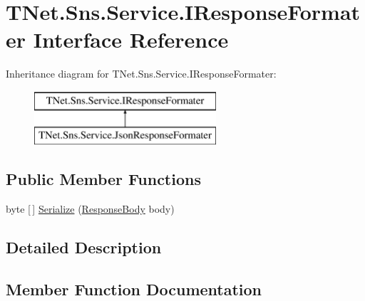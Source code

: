 \hypertarget{interface_t_net_1_1_sns_1_1_service_1_1_i_response_formater}{}\section{T\+Net.\+Sns.\+Service.\+I\+Response\+Formater Interface Reference}
\label{interface_t_net_1_1_sns_1_1_service_1_1_i_response_formater}


 


Inheritance diagram for T\+Net.\+Sns.\+Service.\+I\+Response\+Formater\+:\begin{figure}[H]
\begin{center}
\leavevmode
\includegraphics[height=2.000000cm]{interface_t_net_1_1_sns_1_1_service_1_1_i_response_formater}
\end{center}
\end{figure}
\subsection*{Public Member Functions}
\begin{DoxyCompactItemize}
\item 
byte \mbox{[}$\,$\mbox{]} \mbox{\hyperlink{interface_t_net_1_1_sns_1_1_service_1_1_i_response_formater_ad44ce913b56224414b88e23c18195195}{Serialize}} (\mbox{\hyperlink{class_t_net_1_1_sns_1_1_service_1_1_response_body}{Response\+Body}} body)
\end{DoxyCompactItemize}


\subsection{Detailed Description}




\subsection{Member Function Documentation}
\mbox{\label{interface_t_net_1_1_sns_1_1_service_1_1_i_response_formater_ad44ce913b56224414b88e23c18195195}} 
